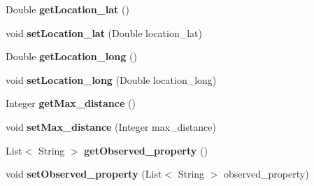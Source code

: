 \begin{DoxyCompactItemize}
\item 
Double {\bfseries get\+Location\+\_\+lat} ()\hypertarget{classeu_1_1h2020_1_1symbiote_1_1query_1_1SearchRequest_afc417e6e5d426d1862e3e9e1311314c6}{}\label{classeu_1_1h2020_1_1symbiote_1_1query_1_1SearchRequest_afc417e6e5d426d1862e3e9e1311314c6}

\item 
void {\bfseries set\+Location\+\_\+lat} (Double location\+\_\+lat)\hypertarget{classeu_1_1h2020_1_1symbiote_1_1query_1_1SearchRequest_a64aa50edc04e5ef88d65d9b8dfc59828}{}\label{classeu_1_1h2020_1_1symbiote_1_1query_1_1SearchRequest_a64aa50edc04e5ef88d65d9b8dfc59828}

\item 
Double {\bfseries get\+Location\+\_\+long} ()\hypertarget{classeu_1_1h2020_1_1symbiote_1_1query_1_1SearchRequest_a30dc9dca9e7053cc705cf80c39b8d6b3}{}\label{classeu_1_1h2020_1_1symbiote_1_1query_1_1SearchRequest_a30dc9dca9e7053cc705cf80c39b8d6b3}

\item 
void {\bfseries set\+Location\+\_\+long} (Double location\+\_\+long)\hypertarget{classeu_1_1h2020_1_1symbiote_1_1query_1_1SearchRequest_af377b74d02c4ee433e13f0c2a50eae1b}{}\label{classeu_1_1h2020_1_1symbiote_1_1query_1_1SearchRequest_af377b74d02c4ee433e13f0c2a50eae1b}

\item 
Integer {\bfseries get\+Max\+\_\+distance} ()\hypertarget{classeu_1_1h2020_1_1symbiote_1_1query_1_1SearchRequest_abe26768baed48be4cbde5bfd8b4c7a0d}{}\label{classeu_1_1h2020_1_1symbiote_1_1query_1_1SearchRequest_abe26768baed48be4cbde5bfd8b4c7a0d}

\item 
void {\bfseries set\+Max\+\_\+distance} (Integer max\+\_\+distance)\hypertarget{classeu_1_1h2020_1_1symbiote_1_1query_1_1SearchRequest_af3b45851073a2bdbffdbe4bb1fc478d9}{}\label{classeu_1_1h2020_1_1symbiote_1_1query_1_1SearchRequest_af3b45851073a2bdbffdbe4bb1fc478d9}

\item 
List$<$ String $>$ {\bfseries get\+Observed\+\_\+property} ()\hypertarget{classeu_1_1h2020_1_1symbiote_1_1query_1_1SearchRequest_af9050259cfb63e802cd654c2e8d7e538}{}\label{classeu_1_1h2020_1_1symbiote_1_1query_1_1SearchRequest_af9050259cfb63e802cd654c2e8d7e538}

\item 
void {\bfseries set\+Observed\+\_\+property} (List$<$ String $>$ observed\+\_\+property)\hypertarget{classeu_1_1h2020_1_1symbiote_1_1query_1_1SearchRequest_a16e9d33081fd64243d67e4f97ec6300e}{}\label{classeu_1_1h2020_1_1symbiote_1_1query_1_1SearchRequest_a16e9d33081fd64243d67e4f97ec6300e}

\end{DoxyCompactItemize}


